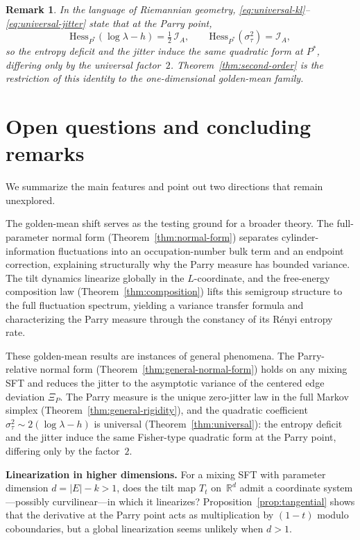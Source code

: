 \documentclass[pdflatex,sn-basic,Numbered]{sn-jnl}
\theoremstyle{thmstyleone}
\theoremstyle{thmstyletwo}
\newtheorem{remark}[theorem]{Remark}
\theoremstyle{thmstylethree}
\newcommand{\RR}{\mathbb{R}}
\begin{document}
\begin{remark}
In the language of Riemannian geometry, \eqref{eq:universal-kl}--\eqref{eq:universal-jitter} state that at the Parry point,
\[
\mathrm{Hess}_{P^*}(\log\lambda-h)=\tfrac{1}{2}\,\mathcal{I}_A,
\qquad
\mathrm{Hess}_{P^*}(\sigma_\tau^2)=\mathcal{I}_A,
\]
so the entropy deficit and the jitter induce the same quadratic form at $P^*$, differing only by the universal factor~$2$. Theorem~\ref{thm:second-order} is the restriction of this identity to the one-dimensional golden-mean family.
\end{remark}

\section{Open questions and concluding remarks}

We summarize the main features and point out two directions that remain unexplored.

The golden-mean shift serves as the testing ground for a broader theory. The full-parameter normal form (Theorem~\ref{thm:normal-form}) separates cylinder-information fluctuations into an occupation-number bulk term and an endpoint correction, explaining structurally why the Parry measure has bounded variance. The tilt dynamics linearize globally in the $L$-coordinate, and the free-energy composition law (Theorem~\ref{thm:composition}) lifts this semigroup structure to the full fluctuation spectrum, yielding a variance transfer formula and characterizing the Parry measure through the constancy of its R\'enyi entropy rate.

These golden-mean results are instances of general phenomena. The Parry-relative normal form (Theorem~\ref{thm:general-normal-form}) holds on any mixing SFT and reduces the jitter to the asymptotic variance of the centered edge deviation $\Xi_P$. The Parry measure is the unique zero-jitter law in the full Markov simplex (Theorem~\ref{thm:general-rigidity}), and the quadratic coefficient $\sigma^2_\tau\sim 2(\log\lambda-h)$ is universal (Theorem~\ref{thm:universal}): the entropy deficit and the jitter induce the same Fisher-type quadratic form at the Parry point, differing only by the factor~$2$.

\medskip
\noindent\textbf{Linearization in higher dimensions.}
For a mixing SFT with parameter dimension $d=|E|-k>1$, does the tilt map $T_t$ on~$\RR^d$ admit a coordinate system---possibly curvilinear---in which it linearizes? Proposition~\ref{prop:tangential} shows that the derivative at the Parry point acts as multiplication by $(1-t)$ modulo coboundaries, but a global linearization seems unlikely when $d>1$.
\end{document}
